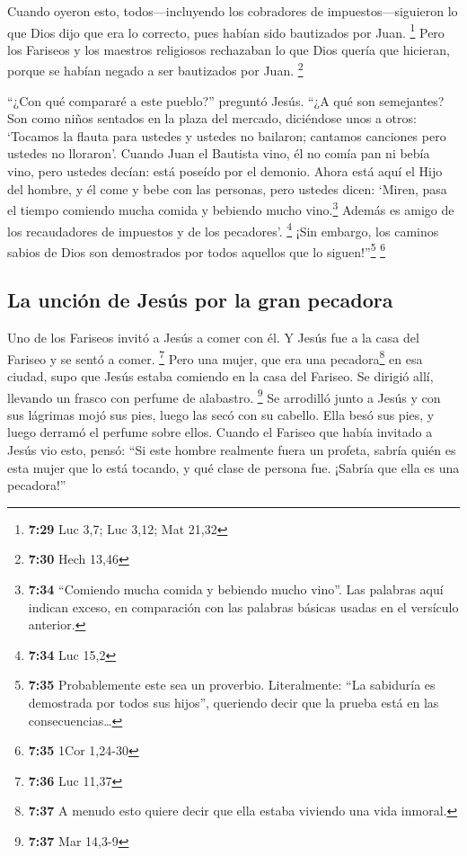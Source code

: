 Cuando oyeron esto, todos---incluyendo los cobradores de
impuestos---siguieron lo que Dios dijo que era lo correcto, pues habían
sido bautizados por Juan. \footnote{\textbf{7:29} Luc 3,7; Luc 3,12; Mat
  21,32}  Pero los Fariseos y los maestros religiosos
rechazaban lo que Dios quería que hicieran, porque se habían negado a
ser bautizados por Juan. \footnote{\textbf{7:30} Hech 13,46}

 ``¿Con qué compararé a este pueblo?'' preguntó Jesús.
``¿A qué son semejantes?  Son como niños sentados en la
plaza del mercado, diciéndose unos a otros: `Tocamos la flauta para
ustedes y ustedes no bailaron; cantamos canciones pero ustedes no
lloraron'.  Cuando Juan el Bautista vino, él no comía pan
ni bebía vino, pero ustedes decían: está poseído por el demonio.
 Ahora está aquí el Hijo del hombre, y él come y bebe con
las personas, pero ustedes dicen: `Miren, pasa el tiempo comiendo mucha
comida y bebiendo mucho vino.\footnote{\textbf{7:34} ``Comiendo mucha
  comida y bebiendo mucho vino''. Las palabras aquí indican exceso, en
  comparación con las palabras básicas usadas en el versículo anterior.}
Además es amigo de los recaudadores de impuestos y de los pecadores'.
\footnote{\textbf{7:34} Luc 15,2}  ¡Sin embargo, los
caminos sabios de Dios son demostrados por todos aquellos que lo
siguen!''\footnote{\textbf{7:35} Probablemente este sea un proverbio.
  Literalmente: ``La sabiduría es demostrada por todos sus hijos'',
  queriendo decir que la prueba está en las consecuencias\ldots{}}
\footnote{\textbf{7:35} 1Cor 1,24-30}

\hypertarget{la-unciuxf3n-de-jesuxfas-por-la-gran-pecadora}{%
\subsection{La unción de Jesús por la gran
pecadora}\label{la-unciuxf3n-de-jesuxfas-por-la-gran-pecadora}}

 Uno de los Fariseos invitó a Jesús a comer con él. Y
Jesús fue a la casa del Fariseo y se sentó a comer. \footnote{\textbf{7:36}
  Luc 11,37}  Pero una mujer, que era una
pecadora\footnote{\textbf{7:37} A menudo esto quiere decir que ella
  estaba viviendo una vida inmoral.} en esa ciudad, supo que Jesús
estaba comiendo en la casa del Fariseo. Se dirigió allí, llevando un
frasco con perfume de alabastro. \footnote{\textbf{7:37} Mar 14,3-9}
 Se arrodilló junto a Jesús y con sus lágrimas mojó sus
pies, luego las secó con su cabello. Ella besó sus pies, y luego derramó
el perfume sobre ellos.  Cuando el Fariseo que había
invitado a Jesús vio esto, pensó: ``Si este hombre realmente fuera un
profeta, sabría quién es esta mujer que lo está tocando, y qué clase de
persona fue. ¡Sabría que ella es una pecadora!''

